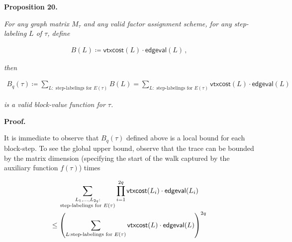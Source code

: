 \documentclass[10pt,a4paper]{article}
\begin{document}


\par\medskip\noindent\textbf{
\textbf{Proposition 20}\textbf{.}
}\par



\emph{For any graph matrix $M_{\tau}$ and any valid factor assignment scheme, for any step-labeling $L$ of $\tau$, define}\par


\[\begin{gathered}
B(L)\coloneqq\mathsf{vtxcost}(L)\cdot\mathsf{edgeval}(L)\,,
\end{gathered}\]


\emph{then}\par


\[\begin{gathered}
\displaystyle B_{q}(\tau)\coloneqq\sum_{L:\text{ step-labelings for }E(\tau)}B(L)=\sum_{L:\text{ step-labelings for }E(\tau)}\mathsf{vtxcost}(L)\cdot\mathsf{edgeval}(L)
\end{gathered}\]


\emph{is a valid block-value function for $\tau$.}\par






\par\medskip\noindent\textbf{Proof.}\par




It is immediate to observe that $B_{q}(\tau)$ defined above is a local bound for each block-step.
To see the global upper bound, observe that the trace can be bounded by the matrix dimension (specifying the start of the walk captured by the auxiliary function $f(\tau)$) times\par


\[\begin{gathered}
\displaystyle\sum_{\begin{subarray}{c}L_{1},\dots,L_{2q}:\\
\text{step-labelings for $E(\tau)$}\end{subarray}}\prod_{i=1}^{2q}\mathsf{vtxcost}(L_{i})\cdot\mathsf{edgeval}(L_{i}) \\
\displaystyle\leq\left(\sum_{L:\text{step-labelings for }E(\tau)}\mathsf{vtxcost}(L)\cdot\mathsf{edgeval}(L)\right)^{2q}
\end{gathered}\]
\end{document}
